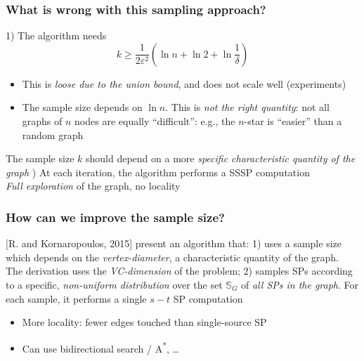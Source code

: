 \begin{frame}
  \frametitle{What is wrong with this sampling approach?}
  1) The algorithm needs
  \[
    k\ge\frac{1}{2\varepsilon^2}\left(\ln n + \ln 2 +
    \ln\frac{1}{\delta}\right)
  \]
  \begin{itemize}
    \item This is \emph{loose due to the union bound}, and does not scale well
      (experiments)
    \pause
    \item The sample size depends on $\ln n$. This is \emph{not the right
      quantity}: not all graphs of $n$ nodes are equally ``difficult'': e.g., the $n$-star is ``easier'' than a random graph
  \end{itemize}
  \pause
  The sample size $k$ should depend on a more \emph{specific characteristic
  quantity of the graph}
  \vfill
  ) At each iteration, the algorithm performs a SSSP computation\\
  \quad \emph{Full exploration} of the graph, no locality
\end{frame}

\begin{frame}
  \frametitle{How can we improve the sample size?}
  [R. and Kornaropoulos, 2015] present an algorithm that:
  \vfill
  1) uses a sample size which depends on the \emph{vertex-diameter}, a
  characteristic quantity of the graph.\\
  \qquad The derivation uses the \emph{VC-dimension} of the problem;
  \pause
  \vfill
  2) samples SPs according to a specific, \emph{non-uniform distribution} over
  the set $\mathbb{S}_G$ of \emph{all SPs in the graph}. For each sample, it
  performs a single $s-t$ SP computation
  \begin{itemize}
    \item More locality: fewer edges touched than single-source SP
    \item Can use bidirectional search / A\textsuperscript{*},
      \ldots
  \end{itemize}
\end{frame}

